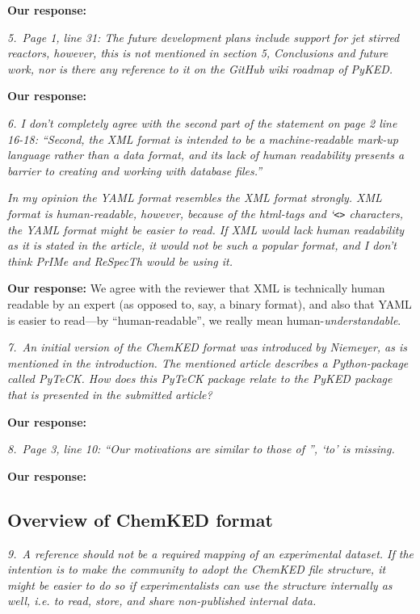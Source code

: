 \documentclass[a4paper,10pt]{elsarticle}
\begin{document}
\textbf{Our response:}


\textit{5.~Page 1, line 31: The future development plans include support for jet stirred reactors, however, this is not mentioned in section 5, Conclusions and future work, nor is there any reference to it on the GitHub wiki roadmap of PyKED.}

\textbf{Our response:}

\textit{6. I don't completely agree with the second part of the statement on page 2 line 16-18: ``Second, the XML format is intended to be a machine-readable mark-up language rather than a data format, and its lack of human readability presents a barrier to creating and working with database files.''}

\textit{In my opinion the YAML format resembles the XML format strongly. XML format is human-readable, however, because of the html-tags and `\texttt{<>} characters, the YAML format might be easier to read. If XML would lack human readability as it is stated in the article, it would not be such a popular format, and I don't think PrIMe and ReSpecTh would be using it.}

\textbf{Our response:}
We agree with the reviewer that XML is technically human readable by an expert (as opposed to, say, a binary format), and also that YAML is easier to read---by ``human-readable'', we really mean human-\emph{understandable}.


\textit{7.~An initial version of the ChemKED format was introduced by Niemeyer, as is mentioned in the introduction. The mentioned article describes a Python-package called PyTeCK. How does this PyTeCK package relate to the PyKED package that is presented in the submitted article?}

\textbf{Our response:}


\textit{8.~Page 3, line 10: ``Our motivations are similar to those of '', `to' is missing.}

\textbf{Our response:}


\subsection*{Overview of ChemKED format}

\textit{9.~A reference should not be a required mapping of an experimental dataset. If the intention is to make the community to adopt the ChemKED file structure, it might be easier to do so if experimentalists can use the structure internally as well, i.e. to read, store, and share non-published internal data.}
\end{document}
